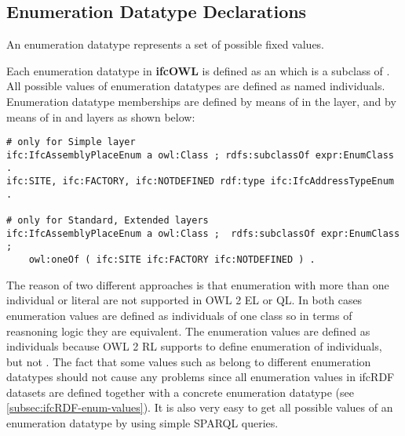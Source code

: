 
\subsection{Enumeration Datatype Declarations}
\label{subsec:ifcOWL-enum-types}

An enumeration data\-type represents a set of possible fixed values. 

\begin{principle}
Each enumeration data\-type in \textbf{ifc\-OWL} is defined as an  which is a subclass of . All possible values of enumeration data\-types are defined as named individuals. Enumeration data\-type memberships are defined by means of  in the \simple{} layer, and by means of  in \standard{} and \extended{} layers as shown below:
\begin{lstlisting}
# only for Simple layer
ifc:IfcAssemblyPlaceEnum a owl:Class ; rdfs:subclassOf expr:EnumClass .
ifc:SITE, ifc:FACTORY, ifc:NOTDEFINED rdf:type ifc:IfcAddressTypeEnum .
    
# only for Standard, Extended layers
ifc:IfcAssemblyPlaceEnum a owl:Class ;  rdfs:subclassOf expr:EnumClass ;
    owl:oneOf ( ifc:SITE ifc:FACTORY ifc:NOTDEFINED ) .
\end{lstlisting}
\end{principle}

The reason of two different approaches is that enumeration with more than one individual or literal are not supported in OWL 2 EL or QL. In both cases enumeration values are defined as individuals of one class so in terms of reasnoning logic they are equivalent. The enumeration values are defined as individuals because OWL 2 RL supports  to define enumeration of individuals, but not  \cite{w3c:owl2-profiles}. The fact that some values such as  belong to different enumeration data\-types should not cause any problems since all enumeration values in ifc\-RDF datasets are defined together with a concrete enumeration data\-type (see \ref{subsec:ifcRDF-enum-values}). It is also very easy to get all possible values of an enumeration data\-type by using simple SPARQL queries.

